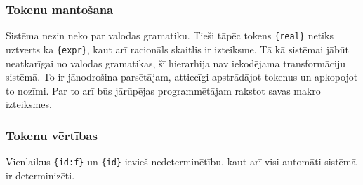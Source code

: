 \subsubsection{Tokenu mantošana}
Sistēma nezin neko par valodas gramatiku. Tieši tāpēc tokens \verb|{real}| netiks uztverts ka \verb|{expr}|, kaut arī racionāls skaitlis ir izteiksme. Tā kā sistēmai jābūt neatkarīgai no valodas gramatikas, šī hierarhija nav iekodējama transformāciju sistēmā. To ir jānodrošina parsētājam, attiecīgi apstrādājot tokenus un apkopojot to nozīmi. Par to arī būs jārūpējas programmētājam rakstot savas makro izteiksmes.

\subsubsection{Tokenu vērtības}
 Vienlaikus \verb|{id:f}| un \verb|{id}| ievieš nedeterminētību, kaut arī visi automāti sistēmā ir determinizēti.
